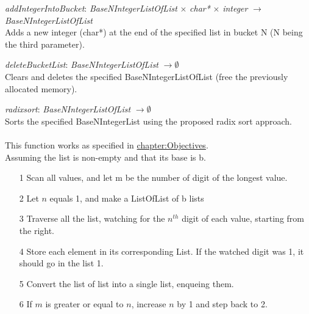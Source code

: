 \documentclass[book, backcover, english, nodocumentinfo]{upmethodology-document}
\begin{document}
		\begin{minipage}{\linewidth}
			\textit{addIntegerIntoBucket}: \textit{BaseNIntegerListOfList} $\times$  \textit{char*} $\times$  \textit{integer} $\rightarrow$ \textit{BaseNIntegerListOfList}\\
			Adds a new integer (char*) at the end of the specified list in bucket N (N being the third parameter).
			\label{algo:BNIL-AddIntegerIntoBucket}
			
		\end{minipage}
		\nxtalgo{}

		\begin{minipage}{\linewidth}
			\textit{deleteBucketList}: \textit{BaseNIntegerListOfList} $\rightarrow \emptyset$\\
			Clears and deletes the specified BaseNIntegerListOfList (free the previously allocated memory).
			\label{algo:BNIL-DeleteBucketList}
			
		\end{minipage}
		\nxtalgo{}

		\begin{minipage}{\linewidth}
			\textit{radixsort}: \textit{BaseNIntegerListOfList} $\rightarrow \emptyset$\\
			Sorts the specified BaseNIntegerList using the proposed radix sort approach.\\
			\ov\\
			This function works as specified in \hyperref[chapter 1]{chapter:Objectives}.\\
			Assuming the list is non-empty and that its base is b.
			\begin{itemize}
				\item[1]{} Scan all values, and let m be the number of digit of the longest value.
				\item[2]{} Let $n$ equals 1, and make a ListOfList of b lists
				\item[3]{} Traverse all the list, watching for the $n^{th}$ digit of each value, starting from the right.
				\item[4]{} Store each element in its corresponding List. If the watched digit was 1, it should go in the  list 1.
				\item[5]{} Convert the list of list into a single list, enqueing them.
				\item[6]{} If $m$ is greater or equal to $n$, increase $n$ by 1 and step back to 2.
			\end{itemize}
			\label{algo:BNIL-RadixSort}
			
		\end{minipage}
		\nxtalgo{}
\end{document}
